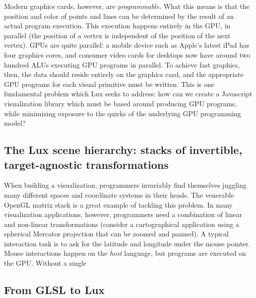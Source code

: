 Modern graphics cards, however, are \emph{programmable}. 
What this means is that the position and color of points and lines can be determined by the result of an actual program execution. 
This execution happens entirely in the GPU, in parallel (the position of a vertex is independent of the position of the next vertex). 
GPUs are quite parallel: a mobile device such as Apple's latest iPad has four graphics cores, and consumer video cards for desktops now have around two hundred ALUs executing GPU programs in parallel. 
To achieve fast graphics, then, the data should reside entirely on the graphics card, and the appropriate GPU programs for each visual primitive must be written. 
This is one fundamental problem which Lux seeks to address: how can we create a Javascript visualization library which must be based around producing GPU programs, while minimizing exposure to the quirks of the underlying GPU programming model?

\subsection{The Lux scene hierarchy: stacks of invertible, target-agnostic transformations}

When building a visualization, programmers invariably find themselves juggling many different spaces and coordinate systems in their heads.
The venerable OpenGL matrix stack is a great example of tackling this problem. 
In many visualization applications, however, programmers need a combination of linear and non-linear transformations (consider a cartographical application using a spherical Mercator projection that can be zoomed and panned).
A typical interaction task is to ask for the latitude and longitude under the mouse pointer. 
Mouse interactions happen on the \emph{host} language, but programs are executed on the GPU.
Without a single


\subsection{From GLSL to Lux}

